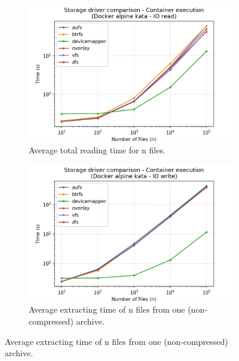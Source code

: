 \begin{figure}[!h]
    
    \begin{subfigure}{.5\textwidth}
      \centering
      \includegraphics[width=\linewidth]{images/storage-driver/storage-driver-execution-Docker-alpine-kata---IO-read.png}
      \caption{Average total reading time for n files.}
      \label{fig:storage-driver:kata:io-read-exec}
    \end{subfigure}
    \begin{subfigure}{.5\textwidth}
      \centering
      \includegraphics[width=\linewidth]{images/storage-driver/storage-driver-execution-Docker-alpine-kata---IO-write.png}
      \caption{Average extracting time of n files from one (non-compressed) archive.}
      \label{fig:storage-driver:kata:io-write-exec}
    \end{subfigure}
    

\end{figure}
